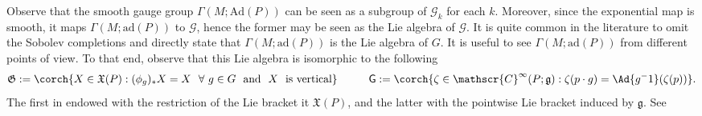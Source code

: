 Observe that the smooth gauge group \(\Gamma(M;\mathrm{Ad}(P))\) can be seen as a subgroup of \(\mathscr{G}_k\) for each \(k\). Moreover, since the exponential map is smooth, it maps \(\Gamma(M; \mathrm{ad}(P))\) to \(\mathscr{G}\), hence the former may be seen as the Lie algebra of \(\mathscr{G}\). It is quite common in the literature to omit the Sobolev completions and directly state that \(\Gamma(M; \mathrm{ad}(P))\) is the Lie algebra of \(G\). It is useful to see \(\Gamma(M; \mathrm{ad}(P))\) from different points of view. To that end, observe that this Lie algebra is isomorphic to the following 
\[
\mathfrak{G}:=\corch{X \in \mathfrak{X}(P): (\phi_g)_*X=X \ \ \forall \ g \in G \ \ \text{and} \ \ X \  \text{ is vertical}} \hspace{1 cm}
\mathsf{G}:=\corch{\zeta \in \mathscr{C}^\infty(P; \mathfrak{g}): \zeta(p\cdot g)=\Ad{g^-1}(\zeta(p))}. 
\]
The first in endowed with the restriction of the Lie bracket it \(\mathfrak{X}(P)\), and the latter with the pointwise Lie bracket induced by \(\mathfrak{g}\). See \parencite[Sec. 3.5]{schmid2004infinite}




